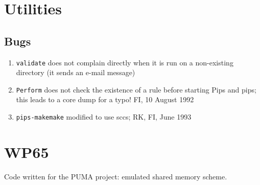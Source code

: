 \section{Utilities}

\subsection{Bugs}

\begin{enumerate}

  \item \verb+validate+ does not complain directly 
	when it is run on a non-existing directory (it sends an e-mail message)

  \item \verb+Perform+ does not check the existence of a rule before
	starting Pips and pips; this leads to a core dump for a typo!
	FI, 10 August 1992

  \item \verb+pips-makemake+ modified to use sccs; RK, FI, June 1993

\end{enumerate}

\section{WP65}

Code written for the PUMA project: emulated shared memory scheme.

